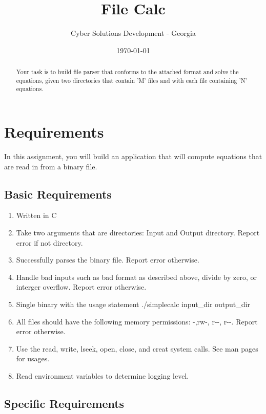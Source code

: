 \documentclass[letterpaper,12pt]{article}
\begin{document}
	
	\title{File Calc}
	\author{Cyber Solutions Development - Georgia}
	\date{\today}
	\maketitle
	
	\begin{abstract}
		Your task is to build file parser that conforms to the attached format and solve the equations, given two directories that contain 'M' files and with each file containing 'N' equations.
	\end{abstract}
	
	
	\section{Requirements}
	
	In this assignment, you will build an application that will compute equations that are read in from a binary file.
	
	\subsection{Basic Requirements}
		\begin{enumerate}
			\item Written in C
			\item Take two arguments that are directories: Input and Output directory. Report error if not directory.
			\item Successfully parses the binary file. Report error otherwise.
			\item Handle bad inputs such as bad format as described above, divide by zero, or interger overflow. Report error otherwise.
			\item Single binary with the usage statement ./simplecalc input\_dir output\_dir	
			\item All files should have the following memory permissions: -,rw-, r-\--, r-\--. Report error otherwise.
			\item Use the read, write, lseek, open, close, and creat system calls. See man pages for usages. 
			\item Read environment variables to determine logging level.
	\end{enumerate}
	
	\subsection{Specific Requirements}
\end{document}
